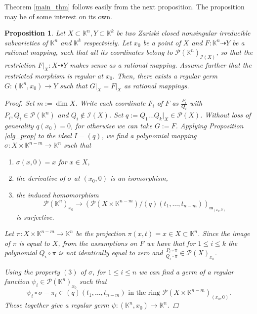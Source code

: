 \documentclass{amsart}
\theoremstyle{plain}
\newtheorem{prop}[thm]{Proposition}
\theoremstyle{definition}
\theoremstyle{remark}
\numberwithin{equation}{section}
\newcommand{\K}{\mathbb{K}}
\newcommand{\PP}{\mathcal{P}}
\newcommand{\I}{\mathcal{I}}
\begin{document}
Theorem \ref{main_thm} follows easily from the next proposition. The proposition may be of some interest on its own.
\begin{prop}\label{main_prop}
Let $X\subset \K^n,Y\subset \K^k$ be two Zariski closed nonsingular irreducible subvarieties of $\K^n$ and $\K^k$ respectviely. Let $x_0$ be a point of $X$ and $F:\K^n\dashrightarrow Y$ be a rational mapping, such that all its coordinates belong to $\PP(\K^n)_{\I(X)}$, so that the restriction $F\vert_X:X\dashrightarrow Y$ makes sense as a rational mapping. Assume further that the restricted morphism is regular at $x_0$. Then, there exists a regular germ $G:(\K^n,x_0)\rightarrow Y$ such that $G\vert_X=F\vert_X$ as rational mappings.  

\begin{proof}
Set $m:=\dim X$. Write each coordinate $F_i$ of $F$ as $\frac{P_i}{Q_i}$ with $P_i,Q_i\in\PP(\K^n)$ and $Q_i\not\in\I(X)$. Set $q:=Q_1\dots Q_k\vert_X\in\PP(X)$. Without loss of generality $q(x_0)=0$, for otherwise we can take $G:=F$. Applying Proposition \ref{alg_prop} to the ideal $I=(q)$, we find a polynomial mapping $\sigma:X\times\K^{n-m}\rightarrow \K^n$ such that
\begin{enumerate}
    \item $\sigma(x,0)=x$ for $x\in X$,
    \item the derivative of $\sigma$ at $(x_0,0)$ is an isomorphism,
    \item the induced homomorphism
    \begin{equation*}
        \PP(\K^n)_{x_0}\rightarrow (\PP(X\times \K^{n-m})/(q)(t_1,\dots,t_{n-m}))_{\mathfrak{m}_{(x_0,0)}}
    \end{equation*}
    is surjective.
\end{enumerate}

Let $\pi:X\times\K^{n-m}\rightarrow \K^n$ be the projection $\pi(x,t)=x\in X\subset \K^n$. Since the image of $\pi$ is equal to $X$, from the assumptions on $F$ we have that for $1\leq i \leq k$ the polynomial $Q_i\circ \pi$ is not identically equal to zero and $\frac{P_i\circ \pi}{Q_i\circ \pi}\in\PP(X)_{x_0}$.


Using the property $(3)$ of $\sigma$, for $1\leq i\leq n$ we can find a germ of a regular function $\psi_i\in\PP(\K^n)_{x_0}$ such that
\begin{equation*}
    \psi_i\circ\sigma-\pi_i\in (q)(t_1,\dots,t_{n-m})\text{ in the ring }\PP(X\times\K^{n-m})_{(x_0,0)}.
\end{equation*}
These together give a regular germ $\psi:(\K^n,x_0)\rightarrow \K^n$.


\end{proof}
\end{prop}
\end{document}
